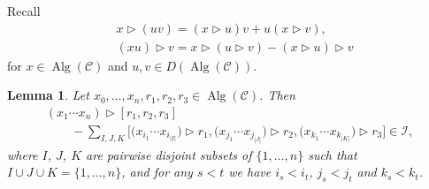 \documentclass[10pt,a4paper]{amsart}
\newcommand*{\Alg}{\operatorname{Alg}}
\numberwithin{equation}{section}
\newtheorem{Lemma}[Theorem]{Lemma}
\begin{document}
Recall
\begin{align*}
 & x \rhd (uv)= (x\rhd u)v + u(x\rhd v), \\
& (xu) \rhd v= x \rhd (u \rhd v) - (x \rhd u) \rhd v
\end{align*}
for $x \in \Alg(\mathcal{C})$ and $u,v \in D(\Alg(\mathcal{C}))$.

\begin{Lemma}\label{Lemma_D_property}
Let $x_0, \dots , x_n , r_1 , r_2, r_3 \in \Alg(\mathcal{C})$. Then
\begin{gather*}
 (x_1 \cdots x_n) \rhd [r_1, r_2, r_3] \\
\qquad {}- \sum_{I,J,K} \bigl[\bigl(x_{i_1} \cdots x_{i_{|I|}}\bigr) \rhd r_1, \bigl(x_{j_1} \cdots x_{j_{|J|}}\bigr) \rhd r_2, \bigl(x_{k_1} \cdots x_{k_{|K|}}\bigr) \rhd r_3\bigr] \in \mathcal{I},
\end{gather*}
where $I$, $J$, $K$ are pairwise disjoint subsets of $\{1, \dots , n\}$ such that $I \cup J \cup K = \{1, \dots , n \}$, and for any $s < t$ we have $i_s < i_t$, $j_s < j_t$ and $k_s < k_t$.
\end{Lemma}
\end{document}
